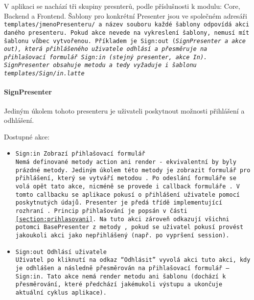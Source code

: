 V aplikaci se nachází tři skupiny presnterů, podle příslušnosti k modulu: Core, Backend a Frontend. Šablony pro konkrétní Presenter jsou ve společném adresáři \tt{templates/jmenoPresenteru/} a název souboru každé šablony odpovídá akci daného presenteru. Pokud akce nevede na vykreslení šablony, nemusí mít šablonu vůbec vytvořenou. Příkladem je \tt{Sign:out} (\it{SignPresenter} a akce \it{out}), která přihlášeného uživatele odhlásí a přesměruje na přihlašovací formulář \tt{Sign:in} (stejný presenter, akce In). SignPresenter obsahuje metodu  a tedy vyžaduje i šablonu \tt{templates/Sign/in.latte}



\paragraph{SignPresenter} Jediným úkolem tohoto presenteru je uživateli poskytnout možnosti přihlášení a odhlášení.


Dostupné akce:
\begin{itemize}
	\item \tt{Sign:in} Zobrazí přihlašovací formulář\\
Nemá definované metody action ani render - ekvivalentní by byly prázdné metody. Jediným úkolem této metody je zobrazit formulář pro přihlášení, který se vytváří metodou . Po~odeslání formuláře se volá opět tato akce, nicméně se provede i callback formuláře . V tomto callbacku se aplikace pokusí o přihlášení uživatele pomocí poskytnutých údajů. Presenter je předá třídě implementující rozhraní . Princip přihlašování je popsán v části \ref{section:prihlasovani}. Na tuto akci zároveň odkazují všichni potomci BasePresenter z metody , pokud se uživatel pokusí provést jakoukoli akci jako nepřihlášený (např. po~vypršení session).
	\item \tt{Sign:out} Odhlásí uživatele\\
Uživatel po kliknutí na odkaz ``Odhlásit'' vyvolá akci tuto akci, kdy je odhlášen a následně přesměrován na přihlašovací formulář -- \tt{Sign:in}. Tato akce nemá render metodu ani šablonu (dochází k přesměrování, které předchází jakémukoli výstupu a ukončuje aktuální cyklus aplikace).
\end{itemize}



